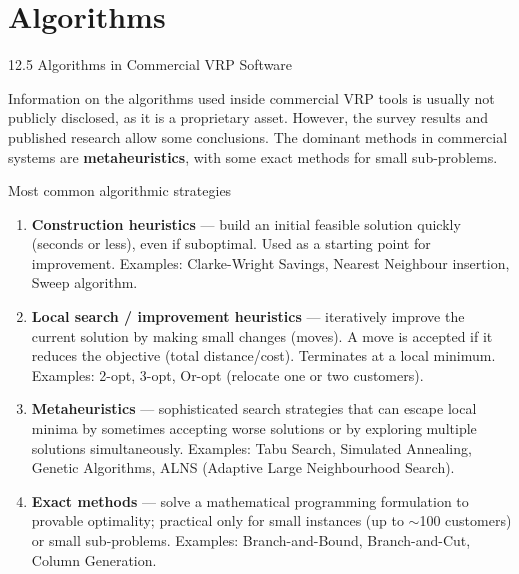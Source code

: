 \documentclass[aspectratio=169,10pt]{beamer}
\begin{document}
\section{Algorithms}

\begin{frame}[allowframebreaks]{12.5 \; Algorithms in Commercial VRP Software}

  Information on the algorithms used inside commercial VRP tools is usually
  not publicly disclosed, as it is a proprietary asset.
  However, the survey results and published research allow some conclusions.
  The dominant methods in commercial systems are \textbf{metaheuristics},
  with some exact methods for small sub-problems.

  \begin{block}{Most common algorithmic strategies}
    \begin{enumerate}
      \item \textbf{Construction heuristics} --- build an initial feasible
            solution quickly (seconds or less), even if suboptimal.
            Used as a starting point for improvement.
            Examples: Clarke-Wright Savings, Nearest Neighbour insertion,
            Sweep algorithm.

      \item \textbf{Local search / improvement heuristics} ---
            iteratively improve the current solution by making small changes
            (moves).
            A move is accepted if it reduces the objective (total distance/cost).
            Terminates at a local minimum.
            Examples: 2-opt, 3-opt, Or-opt (relocate one or two customers).

      \item \textbf{Metaheuristics} --- sophisticated search strategies that
            can escape local minima by sometimes accepting worse solutions
            or by exploring multiple solutions simultaneously.
            Examples: Tabu Search, Simulated Annealing, Genetic Algorithms,
            ALNS (Adaptive Large Neighbourhood Search).

      \item \textbf{Exact methods} --- solve a mathematical programming
            formulation to provable optimality; practical only for
            small instances (up to $\sim$100 customers) or small
            sub-problems.
            Examples: Branch-and-Bound, Branch-and-Cut, Column Generation.
    \end{enumerate}
  \end{block}


\end{frame}
\end{document}
